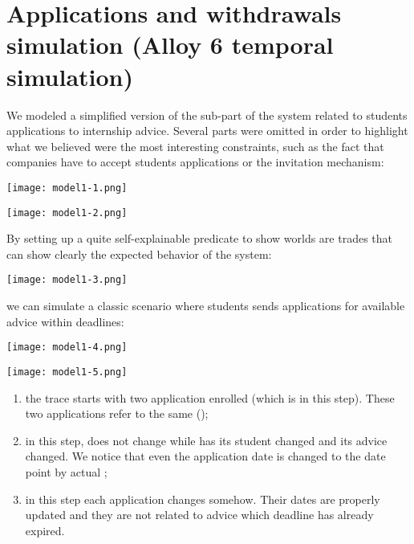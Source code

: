 	\section{Applications and withdrawals simulation (Alloy 6 temporal simulation)}
		We modeled a simplified version of the sub-part of the system related to students applications to internship advice. Several parts were omitted in order to highlight what we believed were the most interesting constraints, such as the fact that companies have to accept students applications or the invitation mechanism:
		\begin{flushleft}
			\texttt{[image: model1-1.png]}
		\end{flushleft}
		\begin{center}
			\texttt{[image: model1-2.png]}
		\end{center}
		By setting up a quite self-explainable predicate to show worlds are trades that can show clearly the expected behavior of the system:
		\begin{center}
			\texttt{[image: model1-3.png]}
		\end{center}
		we can simulate a classic scenario where students sends applications for available advice within deadlines:
		\begin{center}
			\texttt{[image: model1-4.png]}
		\end{center}
		\begin{center}
			\texttt{[image: model1-5.png]}
		\end{center}
		\begin{enumerate}[start=0]
			\item the trace starts with two application enrolled  (which is  in this step). These two applications refer to the same  ();
			\item in this step,  does not change while  has its student changed and its advice changed. We notice that even the application date is changed to the date point by actual ;
			\item in this step each application changes somehow. Their dates are properly updated and they are not related to advice which deadline has already expired.
		\end{enumerate}
		
